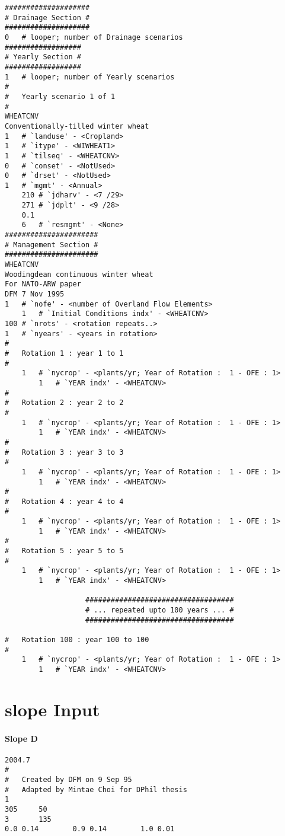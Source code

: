\begin{verbatim}
####################
# Drainage Section #
####################
0	# looper; number of Drainage scenarios
##################
# Yearly Section #
##################
1	# looper; number of Yearly scenarios
#
#	Yearly scenario 1 of 1
#
WHEATCNV
Conventionally-tilled winter wheat
1	# `landuse' - <Cropland>
1	# `itype' - <WIWHEAT1>
1	# `tilseq' - <WHEATCNV>
0	# `conset' - <NotUsed>
0	# `drset' - <NotUsed>
1	# `mgmt' - <Annual>
	210	# `jdharv' - <7 /29>
	271	# `jdplt' - <9 /28>
	0.1
	6	# `resmgmt' - <None>
######################
# Management Section #
######################
WHEATCNV
Woodingdean continuous winter wheat
For NATO-ARW paper
DFM 7 Nov 1995
1	# `nofe' - <number of Overland Flow Elements>
	1	# `Initial Conditions indx' - <WHEATCNV>
100	# `nrots' - <rotation repeats..>
1	# `nyears' - <years in rotation>
#
#	Rotation 1 : year 1 to 1
#
	1	# `nycrop' - <plants/yr; Year of Rotation :  1 - OFE : 1>
		1	# `YEAR indx' - <WHEATCNV>
#
#	Rotation 2 : year 2 to 2
#
	1	# `nycrop' - <plants/yr; Year of Rotation :  1 - OFE : 1>
		1	# `YEAR indx' - <WHEATCNV>
#
#	Rotation 3 : year 3 to 3
#
	1	# `nycrop' - <plants/yr; Year of Rotation :  1 - OFE : 1>
		1	# `YEAR indx' - <WHEATCNV>
#
#	Rotation 4 : year 4 to 4
#
	1	# `nycrop' - <plants/yr; Year of Rotation :  1 - OFE : 1>
		1	# `YEAR indx' - <WHEATCNV>
#
#	Rotation 5 : year 5 to 5
#
	1	# `nycrop' - <plants/yr; Year of Rotation :  1 - OFE : 1>
		1	# `YEAR indx' - <WHEATCNV>

                   ###################################
                   # ... repeated upto 100 years ... #
                   ###################################

#	Rotation 100 : year 100 to 100
#
	1	# `nycrop' - <plants/yr; Year of Rotation :  1 - OFE : 1>
		1	# `YEAR indx' - <WHEATCNV>
\end{verbatim}

\section{slope Input}
\label{sec:WEPPSlopeInput}

\paragraph{Slope D}

\scriptsize

\begin{verbatim}
2004.7
#
#   Created by DFM on 9 Sep 95
#   Adapted by Mintae Choi for DPhil thesis
1
305     50
3       135
0.0 0.14		0.9 0.14		1.0 0.01
\end{verbatim}

